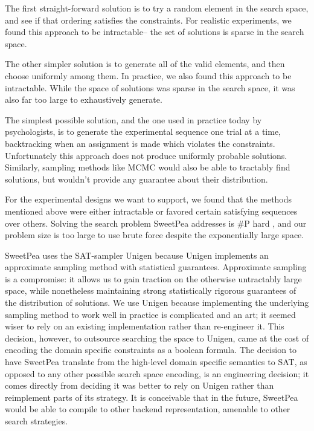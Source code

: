 The first straight-forward solution is to try a random element in the search space, and see if that ordering satisfies the constraints. For realistic experiments, we found this approach to be intractable-- the set of solutions is sparse in the search space.

The other simpler solution is to generate all of the valid elements, and then choose uniformly among them. In practice, we also found this approach to be intractable. While the space of solutions was sparse in the search space, it was also far too large to exhaustively generate.

The simplest possible solution, and the one used in practice today by psychologists, is to generate the experimental sequence one trial at a time, backtracking when an assignment is made which violates the constraints. Unfortunately this approach does not produce uniformly probable solutions. Similarly, sampling methods like MCMC would also be able to tractably find solutions, but wouldn't provide any guarantee about their distribution.

For the experimental designs we want to support, we found that the methods mentioned above were either intractable or favored certain satisfying sequences over others. Solving the search problem SweetPea addresses is \#P hard \cite{valiant1979complexity}, and our problem size is too large to use brute force despite the exponentially large space.

SweetPea uses the SAT-sampler Unigen because Unigen implements an approximate sampling method with statistical guarantees. Approximate sampling is a compromise: it allows us to gain traction on the otherwise untractably large space, while nonetheless maintaining strong statistically rigorous guarantees of the distribution of solutions. We use Unigen because implementing the underlying sampling method to work well in practice is complicated and an art; it seemed wiser to rely on an existing implementation rather than re-engineer it. This decision, however, to outsource searching the space to Unigen, came at the cost of encoding the domain specific constraints as a boolean formula. The decision to have SweetPea translate from the high-level domain specific semantics to SAT, as opposed to any other possible search space encoding, is an engineering decision; it comes directly from deciding it was better to rely on Unigen rather than reimplement parts of its strategy. It is conceivable that in the future, SweetPea would be able to compile to other backend representation, amenable to other search strategies.


